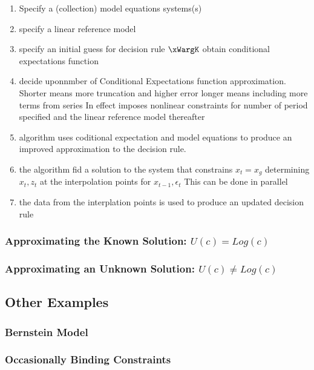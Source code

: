 \documentclass[12pt]{article}
\begin{document}
\begin{enumerate}
\item Specify a (collection) model equations systems(s)
\item specify a linear reference model
\item specify an initial guess for decision rule $\xWargK$ obtain conditional expectations function
\item decide uponnmber of Conditional Expectations function approximation.  Shorter means more truncation and higher error longer means including more terms from series In effect imposes nonlinear constraints for number of period specified and the linear reference model thereafter
\item algorithm uses coditional expectation and model equations to produce an improved approximation to the decision rule.
\item the algorithm fid a solution to the system that constrains $x_t= x_g$ determining $x_t,z_t$ at the interpolation points for $x_{t-1},\epsilon_t$  This can be done in parallel
\item the data from the interplation points is used to produce an updated decision rule
\end{enumerate}


\subsubsection{Approximating the Known Solution: $U(c) = Log(c)$ }
\label{sec:recov-known-solut}

\subsubsection{Approximating an Unknown Solution: $U(c) \ne Log(c)$ }
\label{sec:unknown-solutions}
\subsection{ Other Examples}
\label{sec:otherexamples}

\subsubsection{Bernstein Model}
\label{sec:bernstein-model}



\label{sec:regime-switch-model}

\subsubsection{Occasionally Binding Constraints}
\label{sec:obc-solut}
\end{document}
